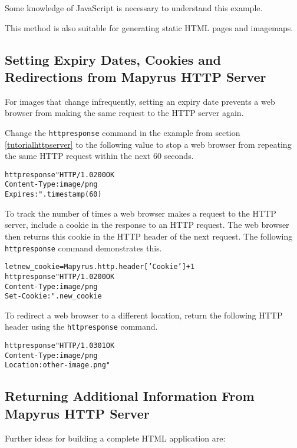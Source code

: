 Some knowledge of JavaScript is necessary to understand this example.

This method is also suitable for generating static HTML pages
and imagemaps.

\subsection{Setting Expiry Dates, Cookies and Redirections from
Mapyrus HTTP Server}
\label{cookies}

For images that change infrequently, setting an expiry date prevents
a web browser from making the same request to the HTTP server again.

Change the \texttt{httpresponse} command in the example
from section \ref{tutorialhttpserver} to the following value to
stop a web browser from repeating the same HTTP request within
the next 60 seconds.

\begin{alltt}
httpresponse "HTTP/1.0 200 OK
Content-Type: image/png
Expires: " . timestamp(60)
\end{alltt}

To track the number of times a web browser makes a request to the
HTTP server, include a cookie in the response to an HTTP request.
The web browser then returns this cookie in the HTTP header of
the next request.  The following \texttt{httpresponse} command
demonstrates this.

\begin{alltt}
let new_cookie = Mapyrus.http.header['Cookie'] + 1
httpresponse "HTTP/1.0 200 OK
Content-Type: image/png
Set-Cookie: " . new_cookie
\end{alltt}

To redirect a web browser to a different location,
return the following HTTP header using the \texttt{httpresponse}
command.

\begin{alltt}
httpresponse "HTTP/1.0 301 OK
Content-Type: image/png
Location: other-image.png"
\end{alltt}

\subsection{Returning Additional Information From Mapyrus HTTP Server}

Further ideas for building a complete HTML application are:


